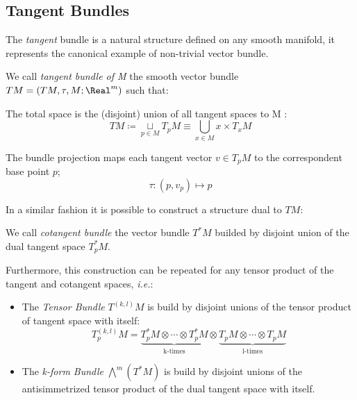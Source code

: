 \documentclass[Main]{subfiles}
\begin{document}
		\subsection{Tangent Bundles}
			The \emph{tangent} bundle is a natural structure defined on any smooth manifold, it represents the canonical example of  non-trivial vector bundle.
						
			\begin{definition}
				We call \emph{tangent bundle of M} the smooth vector bundle $TM=(TM,\tau,M;\Real^m)$ such that:
				\begin{compactitemize}
					\item The total space is the (disjoint) union of all tangent spaces to M :
						$$TM \coloneqq \underset{p \in M}{\sqcup} T_pM  \equiv \bigcup_{x\in M} {x}\times T_x M$$
					\item The bundle projection maps each tangent vector $v\in  T_pM$ to the correspondent base point  $p$;
						$$\tau : (p,v_p) \mapsto p $$
				\end{compactitemize}
			\end{definition}			
			In a similar fashion it is possible to construct a structure dual to $TM$:
			\begin{definition}
				We call \emph{cotangent bundle} the vector bundle $T^*M$ builded by disjoint union of the dual tangent space $T_p^*M $.
			\end{definition}
			Furthermore, this construction can be repeated for any tensor product of the tangent and cotangent spaces, \textit{i.e.}:
				\begin{itemize}
					\item The \emph{Tensor Bundle} $T^{(k,l)}M$ is build by disjoint unions of the tensor product of tangent space with itself:
					\begin{displaymath}
						T^{(k,l)}_ p M = \underbrace{T^*_pM \otimes \cdots \otimes T^*_pM}_{\textrm{k-times}} \otimes
						\underbrace{T_pM \otimes \cdots \otimes T_pM}_{\textrm{l-times}}
					\end{displaymath}
					\item The \emph{k-form Bundle} $ \bigwedge^m( T^*M)$ is build by disjoint unions of the antisimmetrized tensor product of the dual tangent space with itself.
				\end{itemize}
			
\end{document}
